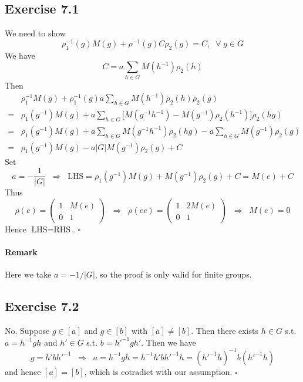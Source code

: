 \documentclass[]{ctexart}
\begin{document}
\subsection{Exercise 7.1}
We need to show 
\begin{equation*}
\rho_1^{-1}(g)M(g)+\rho^{-1}(g)C\rho_2(g)=C,\;\;\forall\;g\in G
\end{equation*}
We have 
\begin{equation*}
C=a\sum_{h\in G}M(h^{-1})\rho_2(h)
\end{equation*}
Then 
\begin{align*}
&\rho_1^{-1}M(g)+\rho_1^{-1}(g)a\sum_{h\in G}M(h^{-1})\rho_2(h)\rho_2(g)\\
={}&\rho_1(g^{-1})M(g)+a\sum_{h\in G}\big[M(g^{-1}h^{-1})-M(g^{-1})\rho_2(h^{-1})\big]\rho_2(hg)\\
={}&\rho_1(g^{-1})M(g)+a\sum_{h\in G}M(g^{-1}h^{-1})\rho_2(hg)-a\sum_{h\in G}M(g^{-1})\rho_2(g)\\
={}&\rho_1(g^{-1})M(g)-a|G|M(g^{-1})\rho_2(g)+C
\end{align*}
Set 
\begin{equation*}
a=-\frac{1}{|G|}\;\;\Rightarrow\;\;\text{LHS}=\rho_1(g^{-1})M(g)+M(g^{-1})\rho_2(g)+C=M(e)+C
\end{equation*}
Thus 
\begin{equation*}
\rho(e)=\begin{pmatrix}
1 & M(e)\\ 0& 1
\end{pmatrix}\;\;\Rightarrow\;\;\rho(ee)=\begin{pmatrix}
1 & 2M(e)\\ 0 & 1
\end{pmatrix}\;\;\Rightarrow\;\;M(e)=0
\end{equation*}
Hence $\text{LHS}=\text{RHS}$. $\square$

\paragraph*{Remark} Here we take $a=-1/|G|$, so the proof is only valid for finite groups. 

\subsection{Exercise 7.2}
No. Suppose $g\in[a]$ and $g\in [b]$ with $[a]\ne [b]$. Then there exists $h\in G$ s.t. $a=h^{-1}gh$ and $h'\in G$ s.t. $b=h'^{-1}gh'$. 
Then we have 
\begin{equation*}
g=h'bh'^{-1}\;\;\Rightarrow\;\;a=h^{-1}gh=h^{-1}h'bh'^{-1}h=(h'^{-1}h)^{-1}b(h'^{-1}h)
\end{equation*}
and hence $[a]=[b]$, which is cotradict with our assumption. $\square$
\end{document}
